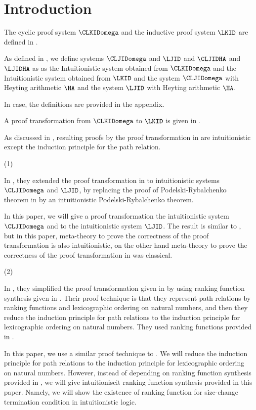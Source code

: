 \section{Introduction}

The cyclic proof system $\CLKIDomega$ and 
the inductive proof system $\LKID$ are defined in \cite{Brotherston11a}.

As defined in \cite{Berardi18},
we define systems $\CLJIDomega$ and $\LJID$ and $\CLJIDHA$ and $\LJIDHA$ as
as the Intuitionistic system obtained from $\CLKIDomega$ 
and the Intuitionistic system obtained from $\LKID$
and the system $\CLJIDomega$ with Heyting arithmetic $\HA$
and the system $\LJID$ with Heyting arithmetic $\HA$.

In case, the definitions are provided in the appendix.

A proof transformation from $\CLKIDomega$ to $\LKID$
is given in \cite{Berardi17}.

As discussed in \cite{Berardi18},
resulting proofs by the proof transformation in \cite{Berardi17} 
are intuitionistic except 
the induction principle for the path relation.

(1)

In \cite{Berardi18},
they extended
the proof transformation in \cite{Berardi17}
to intuitionistic systems $\CLJIDomega$ and $\LJID$,
by replacing the proof of Podelski-Rybalchenko theorem in  \cite{Berardi17}
by an intuitionistic Podelski-Rybalchenko theorem.

In this paper,
we will give
a proof transformation
the intuitionistic system $\CLJIDomega$ and 
to the intuitionistic system $\LJID$.
The result is similar to \cite{Berardi18},
but in this paper,
meta-theory to prove the correctness of the proof transformation
is also intuitionistic,
on the other hand
meta-theory to prove the correctness of the proof transformation
in \cite{Berardi18} was classical.

(2)

In \cite{Ikebuchi25},
they simplified the proof transformation given in \cite{Berardi17}
by using ranking function synthesis given in \cite{Lee09}.
Their proof technique is that
they represent path relations by
ranking functions and lexicographic ordering on natural numbers,
and then
they reduce
the induction principle for path relations
to
the induction principle for lexicographic ordering on natural numbers.
They used ranking functions provided in \cite{Lee09}.

In this paper,
we use a similar proof technique to \cite{Ikebuchi25}.
We will reduce
the induction principle for path relations
to
the induction principle for lexicographic ordering on natural numbers.
However, instead of depending on 
ranking function synthesis provided in \cite{Lee09},
we will give intuitioniscit 
ranking function synthesis provided in this paper.
Namely, we will show
the existence of ranking function for size-change termination condition
in intuitionistic logic.


